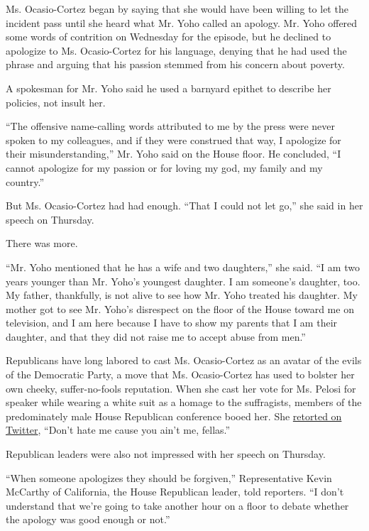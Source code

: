 Ms. Ocasio-Cortez began by saying that she would have been willing to
let the incident pass until she heard what Mr. Yoho called an apology.
Mr. Yoho offered some words of contrition on Wednesday for the episode,
but he declined to apologize to Ms. Ocasio-Cortez for his language,
denying that he had used the phrase and arguing that his passion stemmed
from his concern about poverty.

A spokesman for Mr. Yoho said he used a barnyard epithet to describe her
policies, not insult her.

``The offensive name-calling words attributed to me by the press were
never spoken to my colleagues, and if they were construed that way, I
apologize for their misunderstanding,'' Mr. Yoho said on the House
floor. He concluded, ``I cannot apologize for my passion or for loving
my god, my family and my country.''

But Ms. Ocasio-Cortez had had enough. ``That I could not let go,'' she
said in her speech on Thursday.

There was more.

``Mr. Yoho mentioned that he has a wife and two daughters,'' she said.
``I am two years younger than Mr. Yoho's youngest daughter. I am
someone's daughter, too. My father, thankfully, is not alive to see how
Mr. Yoho treated his daughter. My mother got to see Mr. Yoho's
disrespect on the floor of the House toward me on television, and I am
here because I have to show my parents that I am their daughter, and
that they did not raise me to accept abuse from men.''

Republicans have long labored to cast Ms. Ocasio-Cortez as an avatar of
the evils of the Democratic Party, a move that Ms. Ocasio-Cortez has
used to bolster her own cheeky, suffer-no-fools reputation. When she
cast her vote for Ms. Pelosi for speaker while wearing a white suit as a
homage to the suffragists, members of the predominately male House
Republican conference booed her. She
\href{https://twitter.com/AOC/status/1080998665672630272}{retorted on
Twitter}, ``Don't hate me cause you ain't me, fellas.''

Republican leaders were also not impressed with her speech on Thursday.

``When someone apologizes they should be forgiven,'' Representative
Kevin McCarthy of California, the House Republican leader, told
reporters. ``I don't understand that we're going to take another hour on
a floor to debate whether the apology was good enough or not.''

